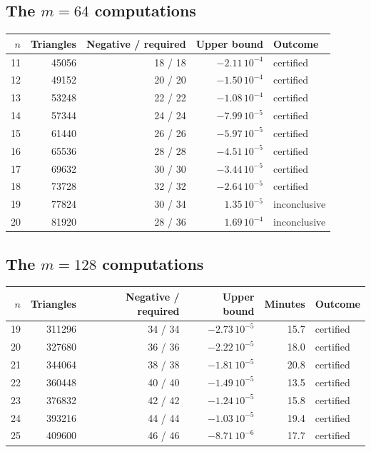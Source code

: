 
\subsection*{The $m=64$ computations}
\begin{center}\small
\begin{tabular}{@{}rrrrl@{}}
\toprule
$n$ & Triangles & Negative / required & Upper bound & Outcome\\\midrule
11 & 45056 & 18 / 18 & $-2.11\,10^{-4}$ & certified\\
12 & 49152 & 20 / 20 & $-1.50\,10^{-4}$ & certified\\
13 & 53248 & 22 / 22 & $-1.08\,10^{-4}$ & certified\\
14 & 57344 & 24 / 24 & $-7.99\,10^{-5}$ & certified\\
15 & 61440 & 26 / 26 & $-5.97\,10^{-5}$ & certified\\
16 & 65536 & 28 / 28 & $-4.51\,10^{-5}$ & certified\\
17 & 69632 & 30 / 30 & $-3.44\,10^{-5}$ & certified\\
18 & 73728 & 32 / 32 & $-2.64\,10^{-5}$ & certified\\
19 & 77824 & 30 / 34 & $1.35\,10^{-5}$ & inconclusive\\
20 & 81920 & 28 / 36 & $1.69\,10^{-4}$ & inconclusive\\
\bottomrule
\end{tabular}\end{center}

\subsection*{The $m=128$ computations}
\begin{center}\small
\begin{tabular}{@{}rrrrrl@{}}
\toprule
$n$ & Triangles & Negative / required & Upper bound & Minutes & Outcome\\\midrule
19 & 311296 & 34 / 34 & $-2.73\,10^{-5}$ & 15.7 & certified\\
20 & 327680 & 36 / 36 & $-2.22\,10^{-5}$ & 18.0 & certified\\
21 & 344064 & 38 / 38 & $-1.81\,10^{-5}$ & 20.8 & certified\\
22 & 360448 & 40 / 40 & $-1.49\,10^{-5}$ & 13.5 & certified\\
23 & 376832 & 42 / 42 & $-1.24\,10^{-5}$ & 15.8 & certified\\
24 & 393216 & 44 / 44 & $-1.03\,10^{-5}$ & 19.4 & certified\\
25 & 409600 & 46 / 46 & $-8.71\,10^{-6}$ & 17.7 & certified\\
\bottomrule
\end{tabular}\end{center}
